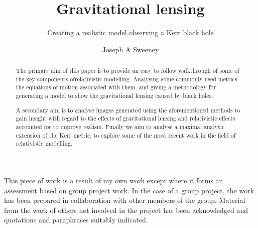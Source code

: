 \documentclass[oneside,openright,frontopenright, singlespacing]{dmathesis}
\begin{document}
\title{Gravitational lensing}
\subtitle{Creating a realistic model observing a Kerr black hole}
\author{Joseph A Sweeney}
\maketitlepage*

\begin{abstract}
%
	The primary aim of this paper is to provide an easy to follow walkthrough of some of the key components ofrelativistic modelling. Analysing some commonly used metrics, the equations of motion associated with them, and giving a methodology for generating a model to show the gravitational lensing caused by black holes.

\vspace{1em}
	A secondary aim is to analyse images generated using the aforementioned methods to gain insight with regard to the effects of gravitational lensing and relativistic effects accounted for to improve realism. Finally we aim to analyse a maximal analytic extension of the Kerr metric, to explore some of the most recent work in the field of relativistic modelling.
\end{abstract}

\begin{declaration*}
%
	This piece of work is a result of my own work except where it forms an assessment based on group project work. In the case of a group project, the work has been prepared in collaboration with other members of the group. Material from the work of others not involved in the project has been acknowledged and quotations and paraphrases suitably indicated.
%
\end{declaration*}

\disableprotrusion
\tableofcontents*
\enableprotrusion

\cleardoublepage
{}
\end{document}
